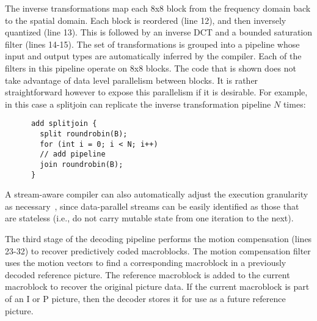 The inverse transformations map each 8x8 block from the frequency
domain back to the spatial domain. Each block is reordered
(line 12), and then inversely quantized (line 13). This is followed by
an inverse DCT and a bounded saturation filter (lines 14-15). The set
of transformations is grouped into a pipeline whose input
and output types are automatically inferred by the compiler. Each of
the filters in this pipeline operate on 8x8 blocks. The code that is
shown does not take advantage of data level parallelism between
blocks. It is rather straightforward however to expose this
parallelism if it is desirable. For example, in this case a splitjoin
can replicate the inverse transformation pipeline $N$ times:
\begin{center}
  \begin{scriptsize}
    \begin{verbatim}
      add splitjoin {
        split roundrobin(B);
        for (int i = 0; i < N; i++) 
        // add pipeline
        join roundrobin(B);
      }
    \end{verbatim}
  \end{scriptsize}
\end{center}
\vspace{-12pt}
A stream-aware compiler can also automatically adjust the execution
granularity as necessary~\cite{gordon02asplos}, since data-parallel streams
can be easily identified as those that are stateless (i.e., do not
carry mutable state from one iteration to the next).

The third stage of the decoding pipeline performs the motion
compensation (lines 23-32) to recover predictively coded
macroblocks. The motion compensation filter uses the motion vectors to
find a corresponding macroblock in a previously decoded reference
picture. The reference macroblock is added to the current macroblock
to recover the original picture data. If the current macroblock is
part of an I or P picture, then the decoder stores it for use as a
future reference picture.

